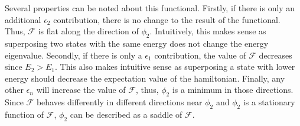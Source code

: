 \begin{sol}
\begin{enumerate}[label=\textbf{(\alph*)}]
Several properties can be noted about this functional. Firstly, if there is only an additional $\epsilon_2$ contribution, there is no change to the result of the functional. Thus, $\mathcal{F}$ is flat along the direction of $\phi_2$. Intuitively, this makes sense as superposing two states with the same energy does not change the energy eigenvalue. Secondly, if there is only a $\epsilon_1$ contribution, the value of $\mathcal{F}$ decreases since $E_2>E_1$. This also makes intuitive sense as superposing a state with lower energy should decrease the expectation value of the hamiltonian. Finally, any other $\epsilon_n$ will increase the value of $\mathcal{F}$, thus, $\phi_2$ is a minimum in those directions. Since $\mathcal{F}$ behaves differently in different directions near $\phi_2$ and $\phi_2$ is a stationary function of $\mathcal{F}$, $\phi_2$ can be described as a saddle of $\mathcal{F}$.
\end{enumerate}
\end{sol}